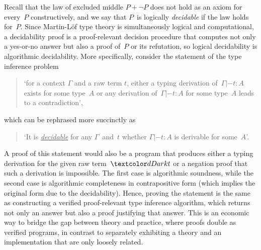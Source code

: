 Recall that the law of excluded middle $P + \neg P$ does not hold as an axiom for every~$P$ constructively, and we say that $P$~is logically \emph{decidable} if the law holds for~$P$.
Since Martin-L\"of type theory is simultaneously logical and computational, a decidability proof is a proof-relevant decision procedure that computes not only a yes-or-no answer but also a proof of~$P$ or its refutation, so logical decidability is algorithmic decidability.
More specifically, consider the statement of the type inference problem
\begin{quote}
  `for a context $\Gamma$ and a raw term $t$, either a typing derivation of\, $\Gamma |- t : A$ exists for some type~$A$ or any derivation of\, $\Gamma |- t : A$ for some type~$A$ leads to a contradiction',
\end{quote}
which can be rephrased more succinctly as
\begin{quote}
  `It is \underline{\emph{decidable}} for any $\Gamma$~and~$t$ whether $\Gamma |- t : A$ is derivable for some~$A$'.
\end{quote}
A proof of this statement would also be a program that produces either a typing derivation for the given raw term~$\isTerm{t}$ or a negation proof that such a derivation is impossible.
The first case is algorithmic soundness, while the second case is algorithmic completeness in contrapositive form (which implies the original form due to the decidability).
Hence, proving the statement is the same as constructing a verified proof-relevant type inference algorithm, which returns not only an answer but also a proof justifying that answer.
This is an economic way to bridge the gap between theory and practice, where proofs double as verified programs, in contrast to separately exhibiting a theory and an implementation that are only loosely related.


